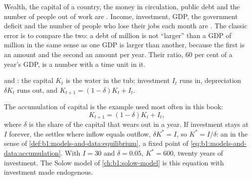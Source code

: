 Wealth, the capital of a country, the money in circulation, public debt
and the number of people out of work are . Income, investment, GDP,
the government deficit and the number of people who lose their jobs each
month are . The classic error is to compare the two: a debt of
 million is not ``larger'' than a GDP of  million in
the same sense as one GDP is larger than another, %
because the first is an amount and the second an amount per year. Their
ratio, 60 per cent of a year's GDP, is a number with a time unit in it.

\begin{omfigure}

{\small {} and : the capital  $K_t$ is the water in the tub;
investment $I_t$ runs in, depreciation $\delta K_t$ runs out, and
$K_{t+1} = (1 - \delta)K_t + I_t$.}
\end{omfigure}

The accumulation of capital is the example used most often in this book:
\begin{equation}\label{eq:b1:models-and-data:accumulation}
K_{t+1} = (1 - \delta)K_t + I_t ,
\end{equation}
where $\delta$ is the share of the capital  that wears out in a year.
If investment stays at $I$ forever, the  settles where inflow equals
outflow, $\delta K^* = I$, so $K^* = I/\delta$: an  in the sense
of \cref{def:b1:models-and-data:equilibrium}, a fixed point of
\eqref{eq:b1:models-and-data:accumulation}. With $I = 30$ and
$\delta = 0.05$, $K^* = 600$, twenty years of investment. The Solow model
of \cref{ch:b1:solow-model} is this equation with investment made
endogenous.

